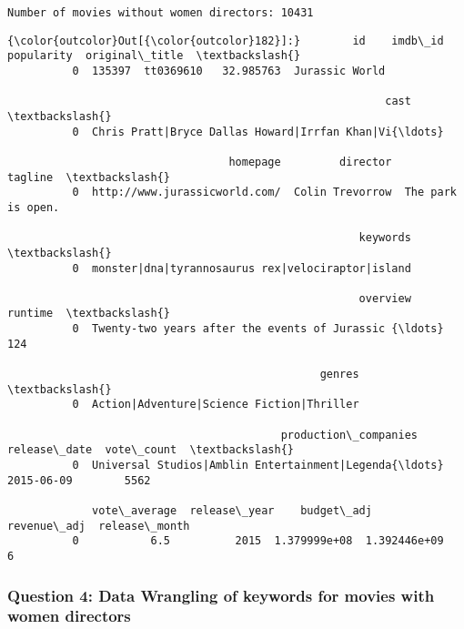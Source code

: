 \documentclass[11pt]{article}
\begin{document}
    \begin{Verbatim}[commandchars=\\\{\}]
Number of movies without women directors: 10431

    \end{Verbatim}

\begin{Verbatim}[commandchars=\\\{\}]
{\color{outcolor}Out[{\color{outcolor}182}]:}        id    imdb\_id  popularity  original\_title  \textbackslash{}
          0  135397  tt0369610   32.985763  Jurassic World   
          
                                                          cast  \textbackslash{}
          0  Chris Pratt|Bryce Dallas Howard|Irrfan Khan|Vi{\ldots}   
          
                                  homepage         director            tagline  \textbackslash{}
          0  http://www.jurassicworld.com/  Colin Trevorrow  The park is open.   
          
                                                      keywords  \textbackslash{}
          0  monster|dna|tyrannosaurus rex|velociraptor|island   
          
                                                      overview  runtime  \textbackslash{}
          0  Twenty-two years after the events of Jurassic {\ldots}      124   
          
                                                genres  \textbackslash{}
          0  Action|Adventure|Science Fiction|Thriller   
          
                                          production\_companies release\_date  vote\_count  \textbackslash{}
          0  Universal Studios|Amblin Entertainment|Legenda{\ldots}   2015-06-09        5562   
          
             vote\_average  release\_year    budget\_adj   revenue\_adj  release\_month  
          0           6.5          2015  1.379999e+08  1.392446e+09              6  
\end{Verbatim}
            
    \hypertarget{question-4-data-wrangling-of-keywords-for-movies-with-women-directors}{%
\subsubsection{Question 4: Data Wrangling of keywords for movies with
women
directors}\label{question-4-data-wrangling-of-keywords-for-movies-with-women-directors}}
\end{document}
